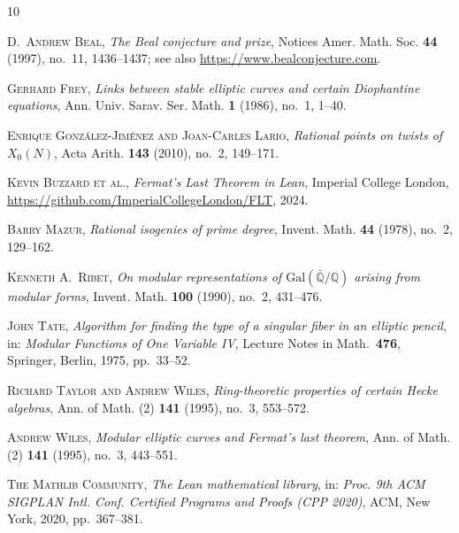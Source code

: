 \documentclass[12pt,reqno]{amsart}
\theoremstyle{plain}
\theoremstyle{definition}
\theoremstyle{remark}
\begin{document}
\begin{thebibliography}{10}

\textsc{D.~Andrew Beal},
\emph{The Beal conjecture and prize},
Notices Amer. Math. Soc. \textbf{44} (1997), no.~11, 1436--1437;
see also \url{https://www.bealconjecture.com}.

\textsc{Gerhard Frey},
\emph{Links between stable elliptic curves and certain Diophantine equations},
Ann. Univ. Sarav. Ser. Math. \textbf{1} (1986), no.~1, 1--40.

\textsc{Enrique González-Jiménez and Joan-Carles Lario},
\emph{Rational points on twists of $X_0(N)$},
Acta Arith. \textbf{143} (2010), no.~2, 149--171.

\textsc{Kevin Buzzard et al.},
\emph{Fermat's Last Theorem in Lean},
Imperial College London,
\url{https://github.com/ImperialCollegeLondon/FLT}, 2024.

\textsc{Barry Mazur},
\emph{Rational isogenies of prime degree},
Invent. Math. \textbf{44} (1978), no.~2, 129--162.

\textsc{Kenneth A.~Ribet},
\emph{On modular representations of $\mathrm{Gal}(\bar{\mathbb{Q}}/\mathbb{Q})$
arising from modular forms},
Invent. Math. \textbf{100} (1990), no.~2, 431--476.

\textsc{John Tate},
\emph{Algorithm for finding the type of a singular fiber in an elliptic pencil},
in: \emph{Modular Functions of One Variable IV},
Lecture Notes in Math.\ \textbf{476},
Springer, Berlin, 1975, pp.\ 33--52.

\textsc{Richard Taylor and Andrew Wiles},
\emph{Ring-theoretic properties of certain Hecke algebras},
Ann. of Math. (2) \textbf{141} (1995), no.~3, 553--572.

\textsc{Andrew Wiles},
\emph{Modular elliptic curves and Fermat's last theorem},
Ann. of Math. (2) \textbf{141} (1995), no.~3, 443--551.

\textsc{The Mathlib Community},
\emph{The Lean mathematical library},
in: \emph{Proc. 9th ACM SIGPLAN Intl. Conf. Certified Programs and Proofs
(CPP 2020)}, ACM, New York, 2020, pp.\ 367--381.

\end{thebibliography}
\end{document}
